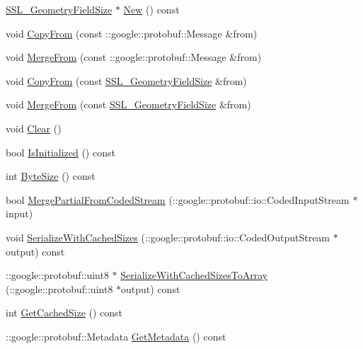 \begin{DoxyCompactItemize}
\hyperlink{class_s_s_l___geometry_field_size}{S\-S\-L\-\_\-\-Geometry\-Field\-Size} $\ast$ \hyperlink{class_s_s_l___geometry_field_size_ab3b8166aa92f945ab5ea228fd67caf1c}{New} () const 
\item 
void \hyperlink{class_s_s_l___geometry_field_size_ac525390b933d079a1f4a6862b5ca590f}{Copy\-From} (const \-::google\-::protobuf\-::\-Message \&from)
\item 
void \hyperlink{class_s_s_l___geometry_field_size_a5ea6829ba129b0149c9f3705b526e5d7}{Merge\-From} (const \-::google\-::protobuf\-::\-Message \&from)
\item 
void \hyperlink{class_s_s_l___geometry_field_size_a23eddb6af2fdc7ba3670d6449cf06213}{Copy\-From} (const \hyperlink{class_s_s_l___geometry_field_size}{S\-S\-L\-\_\-\-Geometry\-Field\-Size} \&from)
\item 
void \hyperlink{class_s_s_l___geometry_field_size_aef3fd9700f6f94ca9738603566f719ab}{Merge\-From} (const \hyperlink{class_s_s_l___geometry_field_size}{S\-S\-L\-\_\-\-Geometry\-Field\-Size} \&from)
\item 
void \hyperlink{class_s_s_l___geometry_field_size_a92dd5af41c8d3d8496d6c17bf16eb8a6}{Clear} ()
\item 
bool \hyperlink{class_s_s_l___geometry_field_size_ac12a356f97afdbbbbe927718c1f311e1}{Is\-Initialized} () const 
\item 
int \hyperlink{class_s_s_l___geometry_field_size_a5ebdf274697f8f0679f1477805da0cc6}{Byte\-Size} () const 
\item 
bool \hyperlink{class_s_s_l___geometry_field_size_aadadbd4d243e71eb3936087305ac0559}{Merge\-Partial\-From\-Coded\-Stream} (\-::google\-::protobuf\-::io\-::\-Coded\-Input\-Stream $\ast$input)
\item 
void \hyperlink{class_s_s_l___geometry_field_size_ae9b16dab4884b0da810311874425c5b7}{Serialize\-With\-Cached\-Sizes} (\-::google\-::protobuf\-::io\-::\-Coded\-Output\-Stream $\ast$output) const 
\item 
\-::google\-::protobuf\-::uint8 $\ast$ \hyperlink{class_s_s_l___geometry_field_size_a8c3c0f7fe4ffd9f6f5fe5b3d65944364}{Serialize\-With\-Cached\-Sizes\-To\-Array} (\-::google\-::protobuf\-::uint8 $\ast$output) const 
\item 
int \hyperlink{class_s_s_l___geometry_field_size_a0ab5c36f226702a39156733c2fcd57e3}{Get\-Cached\-Size} () const 
\item 
\-::google\-::protobuf\-::\-Metadata \hyperlink{class_s_s_l___geometry_field_size_a068e51ad3af650851855094f4ad98255}{Get\-Metadata} () const 

\end{DoxyCompactItemize}
